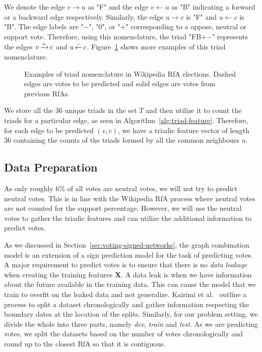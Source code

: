 We denote the edge $v \rightarrow u$ as "F" and the edge $v \leftarrow u$ as "B" indicating a forward or a backward edge respectively.
Similarly, the edge $u \rightarrow c$ is "F" and $u \leftarrow c$ is "B".
The edge labels are "$-$", "$0$", or "$+$" corresponding to a oppose, neutral or support vote.
Therefore, using this nomenclature, the triad "FB+$-$" represents the edges $v\operatorname*{\xrightarrow{+}} c$ and $u \operatorname*{\xleftarrow{-}} c$.
Figure~\ref{fig:triad-naming} shows more examples of this triad nomenclature.

\begin{figure}[htp]
    \centering
    
    \caption{Examples of triad nomenclature in Wikipedia RfA elections. Dashed edges are votes to be predicted and solid edges are votes from previous RfAs.  }
    \label{fig:triad-naming}
\end{figure}
We store all the 36 unique triads in the set $T$ and then utilize it to count the triads for a particular edge, as seen in Algorithm~\ref{alg:triad-feature}.
Therefore, for each edge to be predicted $(v,c)$, we have a triadic feature vector of length 36 containing the counts of the triads formed by all the common neighbours $u$.  

\subsection{Data Preparation}
\label{subsec:data-prep}
As only roughly $6\%$ of all votes are neutral votes, we will not try to predict neutral votes.
This is in line with the Wikipedia RfA process where neutral votes are not counted for the support percentage. 
However, we will use the neutral votes to gather the triadic features and can utilize the additional information to predict votes.

As we discussed in Section~\ref{sec:voting-signed-networks}, the graph combination model is an extension of a sign prediction model for the task of predicting votes.
A major requirement to predict votes is to ensure that there is no \textit{data leakage} when creating the training features $\mathbf{X}$.
A data leak is when we have information about the future available in the training data.
This can cause the model that we train to overfit on the leaked data and not generalize.
Kairimi et al.\ \cite{karimi2019multicongress} outline a process to split a dataset chronologically and gather information respecting the boundary dates at the location of the splits.
Similarly, for our problem setting, we divide the whole \wikirfa into three parts, namely \textit{dev}, \textit{train} and \textit{test}.
As we are predicting votes, we split the datasets based on the number of votes chronologically and round up to the closest RfA so that it is contiguous. 

